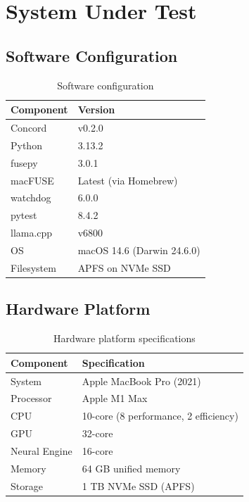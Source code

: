 \documentclass[11pt]{article}
\begin{document}
\section{System Under Test}

\subsection{Software Configuration}

\begin{table}[h]
\centering
\begin{tabular}{ll}
\toprule
\textbf{Component} & \textbf{Version} \\
\midrule
Concord & v0.2.0 \\
Python & 3.13.2 \\
fusepy & 3.0.1 \\
macFUSE & Latest (via Homebrew) \\
watchdog & 6.0.0 \\
pytest & 8.4.2 \\
llama.cpp & v6800 \\
OS & macOS 14.6 (Darwin 24.6.0) \\
Filesystem & APFS on NVMe SSD \\
\bottomrule
\end{tabular}
\caption{Software configuration}
\end{table}

\subsection{Hardware Platform}

\begin{table}[h]
\centering
\begin{tabular}{ll}
\toprule
\textbf{Component} & \textbf{Specification} \\
\midrule
System & Apple MacBook Pro (2021) \\
Processor & Apple M1 Max \\
\quad CPU & 10-core (8 performance, 2 efficiency) \\
\quad GPU & 32-core \\
\quad Neural Engine & 16-core \\
Memory & 64 GB unified memory \\
Storage & 1 TB NVMe SSD (APFS) \\
\bottomrule
\end{tabular}
\caption{Hardware platform specifications}
\end{table}
\end{document}
